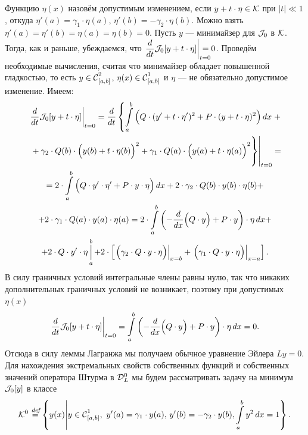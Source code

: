 Функцию $\eta(x)$ назовём допустимым изменением, если $y+t\cdot\eta\in\K$ при $|t|\ll1$, откуда $\eta'(a)={\gamma_1\cdot\eta(a)}$, $\eta'(b)=-\gamma_2\cdot\eta(b)$. Можно взять $\eta'(a)=\eta'(b)=\eta(a)=\eta(b)=0$. Пусть $y$ --- минимайзер для $\J_0$ в $\K$. Тогда{\mb,} как и раньше{\mb,} убеждаемся, что $\displaystyle\left.\der{}{t}\J_0[y+t\cdot\eta]\right|_{\lefteqn{\scriptstyle t=0}}=0$. Проведём необходимые вычисления, считая что минимайзер обладает повышенной гладкостью, то есть $y\in\Cfn[{[a,b]}]{2}$, ${\eta(x)\in\Cfn[{[a,b]}]{1}}$ и $\eta$ --- не обязательно допустимое изменение. Имеем:
\begin{multline*}
	\left.\der{}{t}\J_0[y+t\cdot\eta]\right|_{t=0}=\der{}{t}\left\{\int\limits_a^b\Big( Q\cdot(y'+t\cdot\eta')^2+P\cdot(y+t\cdot\eta)^2\Big)\,dx\right.+\\\left.\left.\vphantom{\int\limits_a^b}+\gamma_2\cdot Q(b)\cdot\Big(y(b)+t\cdot\eta(b)\Big)^2+\gamma_1\cdot Q(a)\cdot\Big(y(a)+t\cdot\eta(a)\Big)^2\right\}\right|_{t=0}=\\=2\cdot\int\limits_a^b\Big(Q\cdot y'\cdot\eta'+P\cdot y\cdot\eta\Big)\,dx+2\cdot\gamma_2\cdot Q(b)\cdot y(b)\cdot\eta(b)+\\
	+2\cdot\gamma_1\cdot Q(a)\cdot y(a)\cdot\eta(a)=2\cdot\int\limits_a^b\left(-\der{}{x}\Big(Q\cdot y\Big)+P\cdot y\right)\cdot\eta\,dx+\\+2\cdot Q\cdot y'\cdot\eta\mathop{\Big|}\limits_a^b
	+2\cdot\left[\left.\Big(\gamma_2\cdot Q\cdot y\cdot\eta\Big)\right|_{ x=b}+\left.\Big(\gamma_1\cdot Q\cdot y\cdot\eta\Big)\right|_{ x=a}\right].
\end{multline*} 
В силу граничных условий {} интегральные члены равны нулю, так что никаких дополнительных граничных условий не возникает, поэтому при допустимых $\eta(x)$
\begin{equation*}
	\left.\der{}{t}\J_0[y+t\cdot\eta]\right|_{t=0}=\int\limits_a^b\left(-\der{}{x}\Big(Q\cdot y\Big)+P\cdot y\right)\cdot\eta\,dx=0.
\end{equation*} 
Отсюда в силу леммы Лагранжа мы получаем обычное уравнение Эйлера $Ly=0$. Для нахождения экстремальных свойств собственных функций и собственных значений оператора Штурма в $\mc{D}_L^0$ мы будем рассматривать задачу на минимум $\J_0[y]$ в классе 
\begin{equation*}
	\K^0\!\eqdef\!\left\{y(x)\middle|y\in\Cfn[{[a,b]}]{1},\ y'(a)=\gamma_1\cdot y(a),\,y'(b)=-\gamma_2\cdot y(b),\int\limits_a^b y^2\,dx=1\right\}.
\end{equation*}
